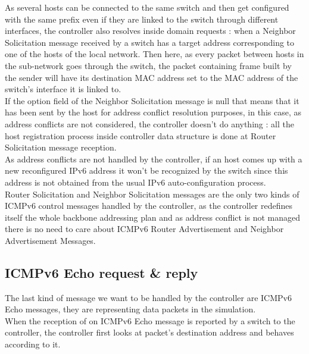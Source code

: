 \documentclass{article}
\begin{document}
As several hosts can be connected to the same switch and then get
configured with the same prefix even if they are linked to the switch
through different interfaces, the controller also resolves inside
domain requests : when a Neighbor Solicitation message received by a
switch has a target address corresponding to one of the hosts of
the local network. Then here, as every packet between hosts in the
sub-network goes through the switch, the packet containing frame built
by the sender will have its destination MAC address set to the MAC
address of the switch's interface it is linked to.\\
\newline
If the option field of the Neighbor Solicitation message is null that
means that it has been sent by the host for address conflict
resolution purposes, in this case, as address conflicts are not
considered, the controller doesn't do anything : all the host
registration process inside controller data structure is done at
Router Solicitation message reception.\\
\newline
As address conflicts are not handled by the controller, if an host
comes up with a new reconfigured IPv6 address it won't be recognized
by the switch since this address is not obtained from the usual IPv6
auto-configuration process.\\
\newline
Router Solicitation and Neighbor Solicitation messages are the only
two kinds of ICMPv6 control messages handled by the controller, as the
controller redefines itself the whole backbone addressing plan and as
address conflict is not managed there is no need to care about ICMPv6
Router Advertisement and Neighbor Advertisement Messages.

\subsection{ICMPv6 Echo request \& reply}

The last kind of message we want to be handled by the controller are
ICMPv6 Echo messages, they are representing data packets in the
simulation.\\
When the reception of on ICMPv6 Echo message is reported
by a switch to the controller, the controller first looks at packet's
destination address and behaves according to it.
\end{document}
